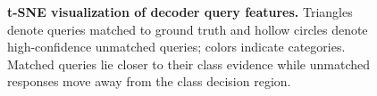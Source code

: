 \begin{figure}[t]
    \centering
    \caption{\textbf{t-SNE visualization of decoder query features.} Triangles denote queries matched to ground truth and hollow circles denote high-confidence unmatched queries; colors indicate categories. Matched queries lie closer to their class evidence while unmatched responses move away from the class decision region.}
    \label{fig:tsne}
\end{figure}
